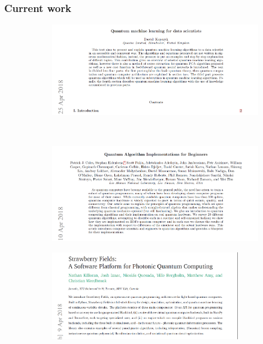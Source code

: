 \documentclass{beamer}
\begin{document}
\begin{frame}
\frametitle{Current work}
\begin{figure}[H]
\centering
\begin{subfigure}[h]{0.49\textwidth}
\includegraphics[width=1\textwidth]{dawid.PNG}
\end{subfigure}~\begin{subfigure}[h]{0.49\textwidth}
\includegraphics[width=1\textwidth]{IBM.PNG}
\end{subfigure}
\vspace{10}
\quad
\begin{subfigure}[h]{0.5\textwidth}
\includegraphics[width=0.9\textwidth]{StrawberryFields.PNG}
\end{subfigure}
\end{figure}
\end{frame}
\end{document}
